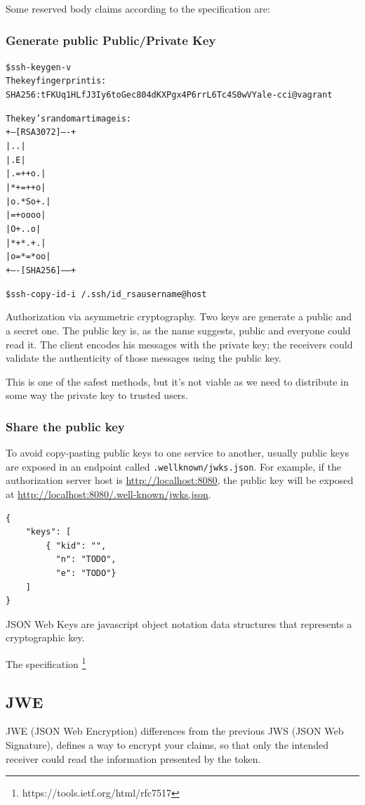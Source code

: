\documentclass[11pt]{style}
\begin{document}
Some reserved body claims according to the specification are:

\subsubsection{Generate public Public/Private Key}
\begin{alltt}
    \$ ssh-keygen -v
    The key fingerprint is:
    SHA256:tFKUq1HLfJ3Iy6toGec804dKXPgx4P6rrL6Tc4S0wVY ale-cci@vagrant

    The key's randomart image is:
    +---[RSA 3072]----+
    |        ..       |
    |       .E        |
    |     . =++ o .   |
    |      *+=++ o    |
    |     o.*So+.     |
    |      =+oooo     |
    |       O+..o     |
    |      *+*.+ .    |
    |     o=*=*oo     |
    +----[SHA256]-----+


    \$ ssh-copy-id -i ~/.ssh/id_rsa username@host
\end{alltt}
Authorization via asymmetric cryptography. Two keys are generate a public and a secret one.
The public key is, as the name suggests, public and everyone could read it.
The client encodes his messages with the private key; the receivers could validate the authenticity of those messages using the public key.

This is one of the safest methods, but it's not viable as we need to distribute in some way the private key to
trusted users.

\subsubsection{Share the public key}
\label{jwks}
To avoid copy-pasting public keys to one service to another, usually public keys
are exposed in an endpoint called \texttt{.wellknown/jwks.json}. For example, if
the authorization server host is \url{http://localhost:8080}, the public key
will be exposed at \url{http://localhost:8080/.well-known/jwks.json}.

\begin{lstlisting}
{
    "keys": [
        { "kid": "",
          "n": "TODO",
          "e": "TODO"}
    ]
}
\end{lstlisting}

JSON Web Keys are javascript object notation data structures that represents a
cryptographic key.

The specification \footnote{https://tools.ietf.org/html/rfc7517}

\subsection{JWE}
JWE (JSON Web Encryption) differences from the previous JWS (JSON Web
Signature), defines a way to encrypt your claims, so that only the intended
receiver could read the information presented by the token.
\end{document}

